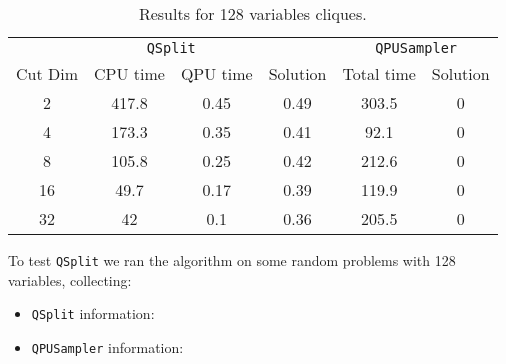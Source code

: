 \documentclass{ceurart}
\begin{document}
\begin{table}
    \centering
    \begin{tabular}{cccc|cc}
        \toprule
        \multicolumn{4}{c}{\texttt{QSplit}} & \multicolumn{2}{c}{\texttt{QPUSampler}} \\
        Cut Dim         & CPU time & QPU time & Solution & Total time & Solution \\
        \midrule
        2               & 417.8    & 0.45     & 0.49     & 303.5      & 0 \\
        4               & 173.3    & 0.35     & 0.41     & 92.1       & 0 \\
        8               & 105.8    & 0.25     & 0.42     & 212.6      & 0 \\
        16              & 49.7     & 0.17     & 0.39     & 119.9      & 0 \\
        32              & 42       & 0.1      & 0.36     & 205.5      & 0 \\
        \bottomrule
    \end{tabular}
    \caption{Results for 128 variables cliques.}
    \label{tab:qsplit}
\end{table}

To test \verb|QSplit| we ran the algorithm on some random problems with 128 variables, collecting:
\begin{itemize}
    \item \texttt{QSplit} information:
    \item \texttt{QPUSampler} information:
\end{itemize}
\end{document}
